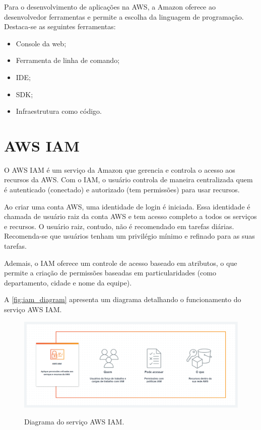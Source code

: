 Para o desenvolvimento de aplicações na AWS, a Amazon oferece ao desenvolvedor ferramentas e permite a escolha da linguagem de programação. Destaca-se as seguintes ferramentas:

\begin{itemize}
	\item Console da web;
	\item Ferramenta de linha de comando;
	\item IDE;
	\item SDK;
	\item Infraestrutura como código.
\end{itemize}

\section{AWS IAM}

O AWS IAM é um serviço da Amazon que gerencia e controla o acesso aos recursos da AWS. Com o IAM, o usuário controla de maneira centralizada quem é autenticado (conectado) e autorizado (tem permissões) para usar recursos.

Ao criar uma conta AWS, uma identidade de login é iniciada. Essa identidade é chamada de usuário raiz da conta AWS e tem acesso completo a todos os serviços e recursos. O usuário raiz, contudo, não é recomendado em tarefas diárias. Recomenda-se que usuários tenham um privilégio mínimo e refinado para as suas tarefas.

Ademais, o IAM oferece um controle de acesso baseado em atributos, o que permite a criação de permissões baseadas em particularidades (como departamento, cidade e nome da equipe).

A \autoref{fig:iam_diagram} apresenta um diagrama detalhando o funcionamento do serviço AWS IAM.

\begin{figure}[htb]
	\centering
	\caption{Diagrama do serviço AWS IAM.}
	\includegraphics[scale=0.3]{Imagens/iam_diagram.png}
	\label{fig:iam_diagram}
\end{figure}

